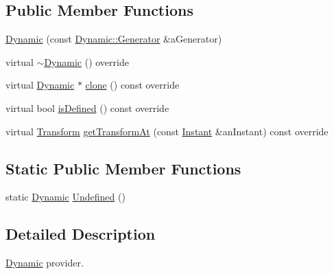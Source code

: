 \subsection*{Public Member Functions}
\begin{DoxyCompactItemize}
\item 
\hyperlink{classlibrary_1_1physics_1_1coord_1_1frame_1_1provider_1_1_dynamic_a9969003390848043b95d6ee4f451eade}{Dynamic} (const \hyperlink{classlibrary_1_1physics_1_1coord_1_1frame_1_1provider_1_1_dynamic_a143db93d5b57faf0e91a812f4203a630}{Dynamic\+::\+Generator} \&a\+Generator)
\item 
virtual \hyperlink{classlibrary_1_1physics_1_1coord_1_1frame_1_1provider_1_1_dynamic_abca1b794d3c6a306fcbc1eef091330b7}{$\sim$\+Dynamic} () override
\item 
virtual \hyperlink{classlibrary_1_1physics_1_1coord_1_1frame_1_1provider_1_1_dynamic}{Dynamic} $\ast$ \hyperlink{classlibrary_1_1physics_1_1coord_1_1frame_1_1provider_1_1_dynamic_a9d1c9b905420f026fa2f9c26305e47fd}{clone} () const override
\item 
virtual bool \hyperlink{classlibrary_1_1physics_1_1coord_1_1frame_1_1provider_1_1_dynamic_a0527b3fd86cdd8070f1697c057f06479}{is\+Defined} () const override
\item 
virtual \hyperlink{classlibrary_1_1physics_1_1coord_1_1_transform}{Transform} \hyperlink{classlibrary_1_1physics_1_1coord_1_1frame_1_1provider_1_1_dynamic_af9d9f53d8269f24b6694494e5128f11e}{get\+Transform\+At} (const \hyperlink{classlibrary_1_1physics_1_1time_1_1_instant}{Instant} \&an\+Instant) const override
\end{DoxyCompactItemize}
\subsection*{Static Public Member Functions}
\begin{DoxyCompactItemize}
\item 
static \hyperlink{classlibrary_1_1physics_1_1coord_1_1frame_1_1provider_1_1_dynamic}{Dynamic} \hyperlink{classlibrary_1_1physics_1_1coord_1_1frame_1_1provider_1_1_dynamic_a1784249ac5b9abb8562316940998aa2e}{Undefined} ()
\end{DoxyCompactItemize}


\subsection{Detailed Description}
\hyperlink{classlibrary_1_1physics_1_1coord_1_1frame_1_1provider_1_1_dynamic}{Dynamic} provider. 

